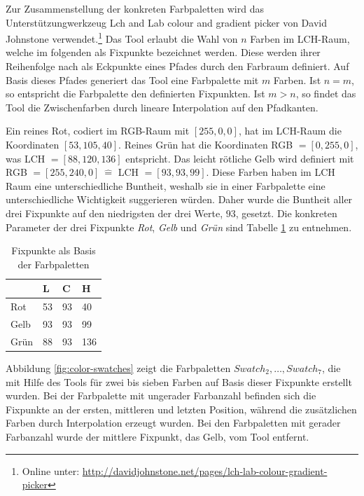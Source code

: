 Zur Zusammenstellung der konkreten Farbpaletten wird das Unterstützungwerkzeug \glqq Lch and Lab colour and gradient picker\grqq{} von David Johnstone verwendet.\footnote{Online unter: \url{http://davidjohnstone.net/pages/lch-lab-colour-gradient-picker}} Das Tool erlaubt die Wahl von $n$ Farben im LCH-Raum, welche im folgenden als \glqq Fixpunkte\grqq{} bezeichnet werden. Diese werden ihrer Reihenfolge nach als Eckpunkte eines Pfades durch den Farbraum definiert. Auf Basis dieses Pfades generiert das Tool eine Farbpalette mit $m$ Farben. Ist $n = m$, so entspricht die Farbpalette den definierten Fixpunkten. Ist $m > n$, so findet das Tool die Zwischenfarben durch lineare Interpolation auf den Pfadkanten.\cite{johnstone}

Ein \glqq reines Rot\grqq, codiert im RGB-Raum mit $[255,0,0]$, hat im LCH-Raum die Koordinaten $[53,105,40]$. \glqq Reines Grün\grqq{} hat die Koordinaten RGB $=[0,255,0]$, was LCH $= [88,120,136]$ entspricht. Das \glqq leicht rötliche Gelb\grqq{} wird definiert mit RGB $=[255,240,0]\ \hat{=}$ LCH $= [93,93,99]$. Diese Farben haben im LCH Raum eine unterschiedliche Buntheit, weshalb sie in einer Farbpalette eine unterschiedliche Wichtigkeit suggerieren würden.\cite{bigman} Daher wurde die Buntheit aller drei Fixpunkte auf den niedrigsten der drei Werte, $93$, gesetzt. Die konkreten Parameter der drei Fixpunkte \emph{Rot}, \emph{Gelb} und \emph{Grün} sind Tabelle \ref{tab:fixpoints} zu entnehmen. 

\begin{table}[h]
\centering
\caption{Fixpunkte als Basis der Farbpaletten}
\label{tab:fixpoints}
\begin{tabular}{@{}llll@{}}
\toprule
                                     & L      & C     & H      \\ \midrule
Rot   & 53     & 93    & 40     \\
Gelb  & 93     & 93    & 99     \\
Grün  & 88     & 93    & 136    \\ \bottomrule
\end{tabular}
\end{table}

Abbildung \ref{fig:color-swatches} zeigt die Farbpaletten $Swatch_2, \ldots, Swatch_7$, die mit Hilfe des Tools für zwei bis sieben Farben auf Basis dieser Fixpunkte erstellt wurden. Bei der Farbpalette mit ungerader Farbanzahl befinden sich die Fixpunkte an der ersten, mittleren und letzten Position, während die zusätzlichen Farben durch Interpolation erzeugt wurden. Bei den Farbpaletten mit gerader Farbanzahl wurde der mittlere Fixpunkt, das Gelb, vom Tool entfernt.

